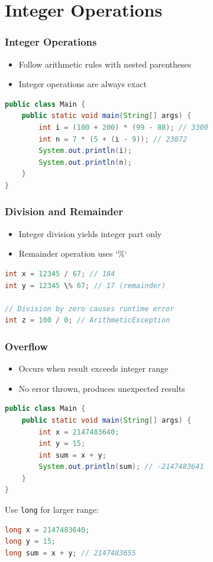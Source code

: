 \documentclass[serif, aspectratio=169]{beamer}
\begin{document}
\section{Integer Operations}
\begin{frame}[fragile]
\frametitle{Integer Operations}
\begin{itemize}
    \item Follow arithmetic rules with nested parentheses
    \item Integer operations are always exact
\end{itemize}
\begin{lstlisting}[language=Java]
public class Main {
    public static void main(String[] args) {
        int i = (100 + 200) * (99 - 88); // 3300
        int n = 7 * (5 + (i - 9)); // 23072
        System.out.println(i);
        System.out.println(n);
    }
}
\end{lstlisting}
\end{frame}

\begin{frame}[fragile]
\frametitle{Division and Remainder}
\begin{itemize}
    \item Integer division yields integer part only
    \item Remainder operation uses `\%`
\end{itemize}
\begin{lstlisting}[language=Java]
int x = 12345 / 67; // 184
int y = 12345 \% 67; // 17 (remainder)

// Division by zero causes runtime error
int z = 100 / 0; // ArithmeticException
\end{lstlisting}
\end{frame}

\begin{frame}[fragile]
\frametitle{Overflow}
\begin{itemize}
    \item Occurs when result exceeds integer range
    \item No error thrown, produces unexpected results
\end{itemize}
\begin{lstlisting}[language=Java]
public class Main {
    public static void main(String[] args) {
        int x = 2147483640;
        int y = 15;
        int sum = x + y;
        System.out.println(sum); // -2147483641
    }
}
\end{lstlisting}
Use \texttt{long} for larger range:
\begin{lstlisting}[language=Java]
long x = 2147483640;
long y = 15;
long sum = x + y; // 2147483655
\end{lstlisting}
\end{frame}
\end{document}
